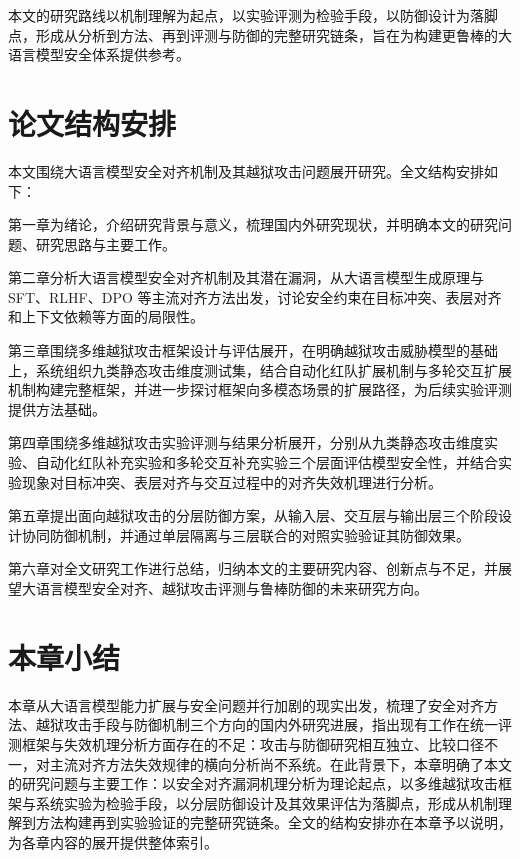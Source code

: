 本文的研究路线以机制理解为起点，以实验评测为检验手段，以防御设计为落脚点，形成从分析到方法、再到评测与防御的完整研究链条，旨在为构建更鲁棒的大语言模型安全体系提供参考。

\section{论文结构安排}

本文围绕大语言模型安全对齐机制及其越狱攻击问题展开研究。全文结构安排如下：

第一章为绪论，介绍研究背景与意义，梳理国内外研究现状，并明确本文的研究问题、研究思路与主要工作。

第二章分析大语言模型安全对齐机制及其潜在漏洞，从大语言模型生成原理与 SFT、RLHF、DPO 等主流对齐方法出发，讨论安全约束在目标冲突、表层对齐和上下文依赖等方面的局限性。

第三章围绕多维越狱攻击框架设计与评估展开，在明确越狱攻击威胁模型的基础上，系统组织九类静态攻击维度测试集，结合自动化红队扩展机制与多轮交互扩展机制构建完整框架，并进一步探讨框架向多模态场景的扩展路径，为后续实验评测提供方法基础。

第四章围绕多维越狱攻击实验评测与结果分析展开，分别从九类静态攻击维度实验、自动化红队补充实验和多轮交互补充实验三个层面评估模型安全性，并结合实验现象对目标冲突、表层对齐与交互过程中的对齐失效机理进行分析。

第五章提出面向越狱攻击的分层防御方案，从输入层、交互层与输出层三个阶段设计协同防御机制，并通过单层隔离与三层联合的对照实验验证其防御效果。

第六章对全文研究工作进行总结，归纳本文的主要研究内容、创新点与不足，并展望大语言模型安全对齐、越狱攻击评测与鲁棒防御的未来研究方向。

\section{本章小结}

本章从大语言模型能力扩展与安全问题并行加剧的现实出发，梳理了安全对齐方法、越狱攻击手段与防御机制三个方向的国内外研究进展，指出现有工作在统一评测框架与失效机理分析方面存在的不足：攻击与防御研究相互独立、比较口径不一，对主流对齐方法失效规律的横向分析尚不系统。在此背景下，本章明确了本文的研究问题与主要工作：以安全对齐漏洞机理分析为理论起点，以多维越狱攻击框架与系统实验为检验手段，以分层防御设计及其效果评估为落脚点，形成从机制理解到方法构建再到实验验证的完整研究链条。全文的结构安排亦在本章予以说明，为各章内容的展开提供整体索引。
